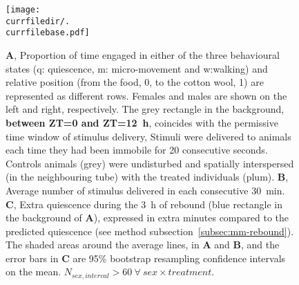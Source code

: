\begin{figure}[h!]
	\centering   
	\texttt{[image: \\currfiledir/.\\currfilebase.pdf]}
	\caption[Quiescence depletion during the L phase does not cause rebound]{
	\textbf{A}, Proportion of time engaged in either of the three behavioural states (q: quiescence, m: micro-movement and w:walking) and relative position (from the food, 0, to the cotton wool, 1) 
	are represented as different rows.
	Females and males are shown on the left and right, respectively.
	The grey rectangle in the background,
	\textbf{between ZT=0 and ZT=12~h}, %
	coincides with the permissive time window of stimulus delivery,
	Stimuli were delivered to animals each time they had been immobile for 20 consecutive seconds. %
	Controls animals (grey) were undisturbed and spatially interspersed (in the neighbouring tube) with the treated individuals (plum).
	\textbf{B}, Average number of stimulus delivered in each consecutive 30~min.
	\textbf{C}, Extra quiescence during the 3~h of rebound (blue rectangle in the background of \textbf{A}), expressed in extra minutes compared to the predicted quiescence (see method subsection~\ref{subsec:mm-rebound}).
	The shaded areas around the average lines, in \textbf{A} and \textbf{B}, and the error bars in \textbf{C} are 95\% bootstrap resampling confidence intervals on the mean.
	$N_{sex,interval} > 60~\forall~sex \times treatment$. %
	\label{fig:\currfilebase}
}
\end{figure}
